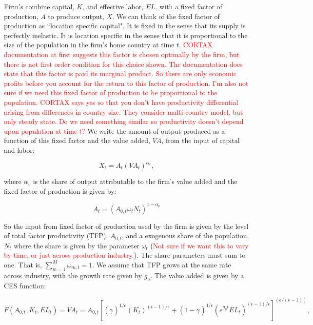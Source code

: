 Firm's combine capital, $K$, and effective labor, $EL$, with a fixed factor of production, $A$ to produce output, $X$.  We can think of the fixed factor of production as ``location specific capital".  It is fixed in the sense that its supply is perfectly inelastic.  It is location specific in the sense that it is proportional to the size of the population in the firm's home country at time $t$. \textcolor{red}{CORTAX documentation at first suggests this factor is chosen optimally by the firm, but there is not first order condition for this choice shown.  The documentation does state that this factor is paid its marginal product.  So there are only economic profits before you account for the return to this factor of production.  I'm also not sure if we need this fixed factor of production to be proportional to the population.  CORTAX says yes so that you don't have productivity differential arising from differences in country size.  They consider multi-country model, but only steady state.  Do we need something similar so productivity doesn't depend upon population at time $t$?}  We write the amount of output produced as a function of this fixed factor and the value added, $VA$, from the input of capital and labor:

\begin{equation}
X_{t} = A_{t}(VA_{t})^{\alpha_{v}},
\end{equation} 

\noindent\noindent where $\alpha_{v}$ is the share of output attributable to the firm's value added and the fixed factor of production is given by:

\begin{equation}
A_{t} = (A_{0,t}\omega_{t}N_{t})^{1-\alpha_{v}}
\end{equation}

\noindent\noindent  So the input from fixed factor of production used by the firm is given by the level of total factor productivity (TFP), $A_{0,t}$, and a exogenous share of the population, $N_{t}$ where the share is given by the parameter $\omega_{t}$ (\textcolor{red}{Not sure if we want this to vary by time, or just across production industry.}).  The share parameters must sum to one.  That is, $\sum_{m=1}^{M} \omega_{m,t} = 1$.     We assume that TFP grows at the same rate across industry, with the growth rate given by $g_{a}$.  The value added is given by a CES function:

\begin{equation}
\label{eqn:prod_fun}
F(A_{0,t},K_{t},EL_{t})=VA_{t} =A_{0,t} \left[(\gamma_{})^{1/\epsilon_{}}(K_{t})^{(\epsilon-1)/\epsilon_{}}+(1-\gamma_{})^{1/\epsilon_{}}(e^{g_{y}t}EL_{t})^{(\epsilon_{}-1)/\epsilon_{}}\right]^{(\epsilon_{}/(\epsilon_{}-1))},
\end{equation}

